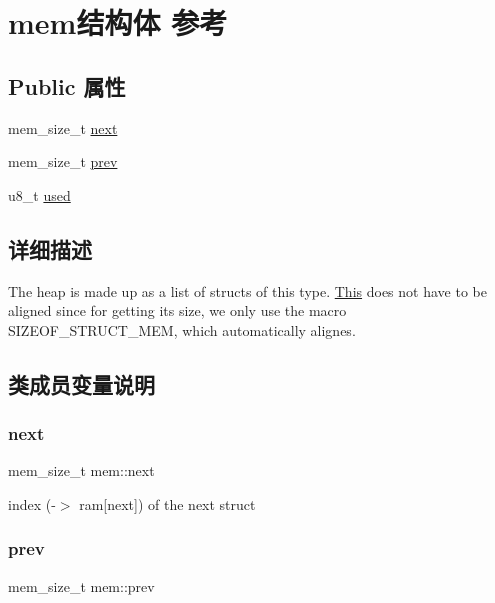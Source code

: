 \hypertarget{structmem}{}\section{mem结构体 参考}
\label{structmem}
\subsection*{Public 属性}
\begin{DoxyCompactItemize}
\item 
mem\+\_\+size\+\_\+t \hyperlink{structmem_a5abf13a11156e92c417f7ff66ef0b5cf}{next}
\item 
mem\+\_\+size\+\_\+t \hyperlink{structmem_a9d7722ed10adf965fa98563d502f98ac}{prev}
\item 
u8\+\_\+t \hyperlink{structmem_aa76b6a39425617435978dce903f0d456}{used}
\end{DoxyCompactItemize}


\subsection{详细描述}
The heap is made up as a list of structs of this type. \hyperlink{namespace_this}{This} does not have to be aligned since for getting its size, we only use the macro S\+I\+Z\+E\+O\+F\+\_\+\+S\+T\+R\+U\+C\+T\+\_\+\+M\+EM, which automatically alignes. 

\subsection{类成员变量说明}
\mbox{\label{structmem_a5abf13a11156e92c417f7ff66ef0b5cf}} 
\subsubsection{\texorpdfstring{next}{next}}
{\footnotesize\ttfamily mem\+\_\+size\+\_\+t mem\+::next}

index (-\/$>$ ram\mbox{[}next\mbox{]}) of the next struct \mbox{\label{structmem_a9d7722ed10adf965fa98563d502f98ac}} 
\subsubsection{\texorpdfstring{prev}{prev}}
{\footnotesize\ttfamily mem\+\_\+size\+\_\+t mem\+::prev}


